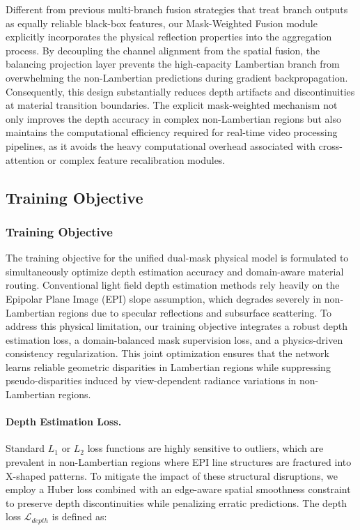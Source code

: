 Different from previous multi-branch fusion strategies that treat branch outputs as equally reliable black-box features, our Mask-Weighted Fusion module explicitly incorporates the physical reflection properties into the aggregation process. By decoupling the channel alignment from the spatial fusion, the balancing projection layer prevents the high-capacity Lambertian branch from overwhelming the non-Lambertian predictions during gradient backpropagation. Consequently, this design substantially reduces depth artifacts and discontinuities at material transition boundaries. The explicit mask-weighted mechanism not only improves the depth accuracy in complex non-Lambertian regions but also maintains the computational efficiency required for real-time video processing pipelines, as it avoids the heavy computational overhead associated with cross-attention or complex feature recalibration modules.

\subsection{Training Objective}

\subsubsection{Training Objective}

The training objective for the unified dual-mask physical model is formulated to simultaneously optimize depth estimation accuracy and domain-aware material routing. Conventional light field depth estimation methods rely heavily on the Epipolar Plane Image (EPI) slope assumption, which degrades severely in non-Lambertian regions due to specular reflections and subsurface scattering. To address this physical limitation, our training objective integrates a robust depth estimation loss, a domain-balanced mask supervision loss, and a physics-driven consistency regularization. This joint optimization ensures that the network learns reliable geometric disparities in Lambertian regions while suppressing pseudo-disparities induced by view-dependent radiance variations in non-Lambertian regions.

\paragraph{Depth Estimation Loss.}

Standard $L_1$ or $L_2$ loss functions are highly sensitive to outliers, which are prevalent in non-Lambertian regions where EPI line structures are fractured into X-shaped patterns. To mitigate the impact of these structural disruptions, we employ a Huber loss combined with an edge-aware spatial smoothness constraint to preserve depth discontinuities while penalizing erratic predictions. The depth loss $\mathcal{L}_{depth}$ is defined as:

